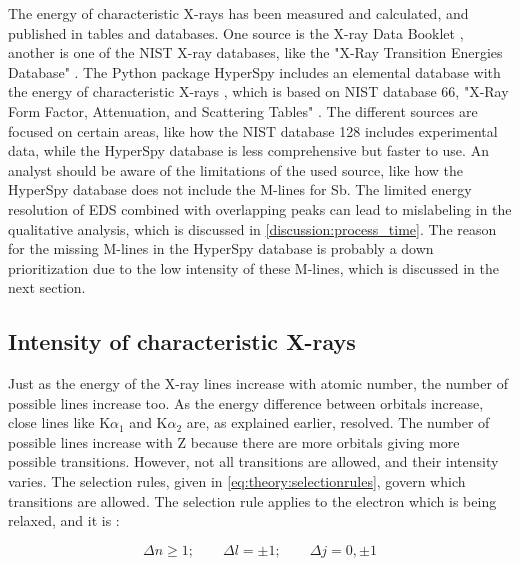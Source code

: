 The energy of characteristic X-rays has been measured and calculated, and published in tables and databases.
One source is the X-ray Data Booklet \cite{thompson_x-ray_2004}, another is one of the NIST X-ray databases, like the "X-Ray Transition Energies Database" \cite{nist_xraydatabase}.
The Python package HyperSpy includes an elemental database with the energy of characteristic X-rays \cite{hyperspy_1.7.1}, which is based on NIST database 66, "X-Ray Form Factor, Attenuation, and Scattering Tables" \cite{nist_xraydatabase_hyperspy}.
The different sources are focused on certain areas, like how the NIST database 128 includes experimental data, while the HyperSpy database is less comprehensive but faster to use.
An analyst should be aware of the limitations of the used source, like how the HyperSpy database does not include the M-lines for Sb.
The limited energy resolution of EDS combined with overlapping peaks can lead to mislabeling in the qualitative analysis, which is discussed in \cref{discussion:process_time}.
The reason for the missing M-lines in the HyperSpy database is probably a down prioritization due to the low intensity of these M-lines, which is discussed in the next section.



\subsection{Intensity of characteristic X-rays}
\label{theory:xray_formation:intensity}

Just as the energy of the X-ray lines increase with atomic number, the number of possible lines increase too.
As the energy difference between orbitals increase, close lines like K$\alpha_1$ and K$\alpha_2$ are, as explained earlier, resolved.
The number of possible lines increase with Z because there are more orbitals giving more possible transitions.
However, not all transitions are allowed, and their intensity varies.
The selection rules, given in \cref{eq:theory:selectionrules}, govern which transitions are allowed.
The selection rule applies to the electron which is being relaxed, and it is \cite[Sec. 8.2.2.2]{hollas_modern_2004}:

\begin{equation}
    \label{eq:theory:selectionrules}
    \Delta n \ge 1;\qquad \Delta l  = \pm 1;\qquad \Delta j = 0, \pm 1
\end{equation}

